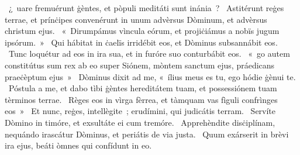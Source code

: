 {%
~¿~uare fremuérunt ġèntes, et pòpuli meditáti sunt inánia~?
~Astitérunt reġes terrae, et prínċipes convenérunt in unum advèrsus Dòminum, et advèrsus christum ejus.
~«~Dirumpámus vìncula eórum, et projiċiámus a nobïs jugum ipsórum.~»
~Qui hábitat in ċaelïs irridébit eos, et Dòminus subsannábit eos.
~Tunc loquétur ad eos in ira sua, et in furóre suo conturbábit eos.
~«~go autem constitútus sum rex ab eo super Siónem, mòntem sanctum ejus, práedicans praeċèptum ejus~»
~Dòminus dixit ad me, «~ílius meus es tu, ego hódie ġènui te.
~Póstula a me, et dabo tìbi ġèntes hereditátem tuam, et possessiónem tuam tèrminos terrae.
~Règes eos in vìrga fèrrea, et tàmquam vas fìguli confrìnges eos~»
~Et nunc, reġes, intellègite~; erudímini, qui judicátis terram.
~Servíte Dòmino in timóre, et exsultáte ei cum tremóre.
~Apprehèndite disċiplínam, nequándo irascátur Dòminus, et periátis de via justa.
~Quum exárserit in brèvi ira ejus, beáti òmnes qui confídunt in eo.}
